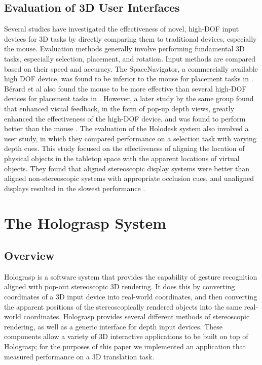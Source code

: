 \documentclass[pageno]{jpaper}
\begin{document}
\subsection{Evaluation of 3D User Interfaces}
Several studies have investigated the effectiveness of novel, high-DOF input devices for 3D tasks by directly comparing them to traditional devices, especially the mouse.
Evaluation methods generally involve performing fundamental 3D tasks, especially selection, placement, and rotation. Input methods are compared based on their
speed and accuracy. The SpaceNavigator, a commercially available high DOF device, was found to be inferior to the mouse for placement tasks in
\cite{mattheiss2011navigating}. B{\'e}rard et al also found the mouse to be more effective than several high-DOF devices for placement tasks
in \cite{study1}.  However, a later study by the same group found that enhanced visual feedback, in the form of pop-up depth views, greatly enhanced the effectiveness
of the high-DOF device, and was found to perform better than the mouse \cite{study2}. The
evaluation of the Holodesk system also involved a user study, in which they compared performance on a selection task with varying depth cues. This study focused on
the effectiveness of aligning the location of physical objects in the tabletop space with the apparent locations of virtual objects. They found that aligned
stereoscopic display systems were better than aligned non-stereoscopic systems with appropriate occlusion cues, and unaligned displays resulted in the slowest performance \cite{holodesk}.
\newpage
\section{The Holograsp System}
\label{sec:holograsp}
\subsection{Overview}
Holograsp is a software system that provides the capability of gesture recognition aligned with pop-out stereoscopic 3D rendering. 
It does this by converting coordinates of a 3D input device into real-world coordinates, and then converting the 
apparent positions of the stereoscopically rendered objects into the same real-world coordinates. 
Holograsp provides several different methods of stereoscopic rendering, as well as
a generic interface for depth input devices. These components allow a variety of 3D interactive applications to be built on top of Holograsp;
for the purposes of this paper we implemented an application that measured performance on a 3D translation task.
\end{document}
